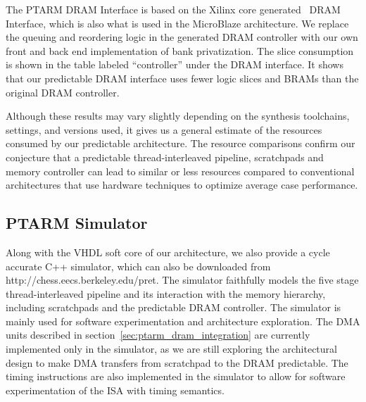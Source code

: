 The PTARM DRAM Interface is based on the Xilinx core generated~\cite{xilinx_coregen} DRAM Interface, which is also what is used in the MicroBlaze architecture. 
We replace the queuing and reordering logic in the generated DRAM controller with our own front and back end implementation of bank privatization. 
The slice consumption is shown in the table labeled ``controller'' under the DRAM interface.
It shows that our predictable DRAM interface uses fewer logic slices and BRAMs than the original DRAM controller.

Although these results may vary slightly depending on the synthesis toolchains, settings, and versions used, it gives us a general estimate of the resources consumed by our predictable architecture. 
The resource comparisons confirm our conjecture that a predictable thread-interleaved pipeline, scratchpads and memory controller can lead to similar or less resources compared to conventional architectures that use hardware techniques to optimize average case performance. 	 
  
\subsection{PTARM Simulator}
\label{sec:ptarm_sim}
Along with the VHDL soft core of our architecture, we also provide a cycle accurate C++ simulator, which can also be downloaded from http://chess.eecs.berkeley.edu/pret. 
The simulator faithfully models the five stage thread-interleaved pipeline and its interaction with the memory hierarchy, including scratchpads and the predictable DRAM controller.
The simulator is mainly used for software experimentation and architecture exploration.    
The DMA units described in section~\ref{sec:ptarm_dram_integration} are currently implemented only in the simulator, as we are still exploring the architectural design to make DMA transfers from scratchpad to the DRAM predictable. 
The timing instructions are also implemented in the simulator to allow for software experimentation of the ISA with timing semantics.

